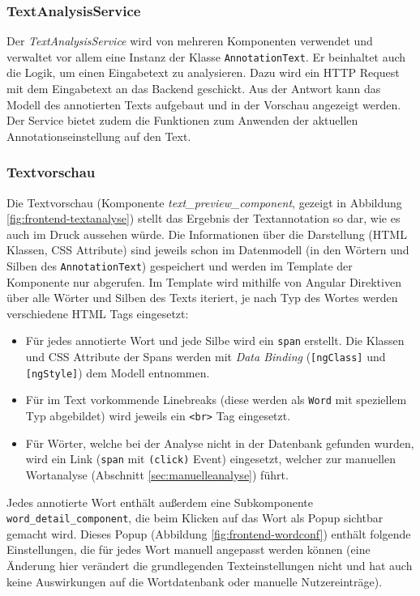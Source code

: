 \subsubsection{TextAnalysisService}

Der \textit{TextAnalysisService} wird von mehreren Komponenten verwendet und verwaltet vor allem eine Instanz der Klasse \texttt{AnnotationText}. Er beinhaltet auch die Logik, um einen Eingabetext zu analysieren. Dazu wird ein HTTP Request mit dem Eingabetext an das Backend geschickt. Aus der Antwort kann das Modell des annotierten Texts aufgebaut und in der Vorschau angezeigt werden. Der Service bietet zudem die Funktionen zum Anwenden der aktuellen Annotationseinstellung auf den Text.

\subsubsection{Textvorschau}

Die Textvorschau (Komponente \textit{text\_preview\_component}, gezeigt in Abbildung \ref{fig:frontend-textanalyse}) stellt das Ergebnis der Textannotation so dar, wie es auch im Druck aussehen würde. Die Informationen über die Darstellung (HTML Klassen, CSS Attribute) sind jeweils schon im Datenmodell (in den Wörtern und Silben des \texttt{AnnotationText}) gespeichert und werden im Template der Komponente nur abgerufen. Im Template wird mithilfe von Angular Direktiven über alle Wörter und Silben des Texts iteriert, je nach Typ des Wortes werden verschiedene HTML Tags eingesetzt:
\begin{itemize}
	\item Für jedes annotierte Wort und jede Silbe wird ein \texttt{span} erstellt. Die Klassen und CSS Attribute der  Spans werden mit \textit{Data Binding} (\texttt{[ngClass]} und \texttt{[ngStyle]}) dem Modell entnommen.
	
	\item Für im Text vorkommende Linebreaks (diese werden als \texttt{Word} mit speziellem Typ abgebildet) wird jeweils ein \texttt{<br>} Tag eingesetzt.
	
	\item Für Wörter, welche bei der Analyse nicht in der Datenbank gefunden wurden, wird ein Link (\texttt{span} mit \texttt{(click)} Event) eingesetzt, welcher zur manuellen Wortanalyse (Abschnitt \ref{sec:manuelleanalyse}) führt.
\end{itemize}

Jedes annotierte Wort enthält außerdem eine Subkomponente \texttt{word\_detail\_component}, die beim Klicken auf das Wort als Popup sichtbar gemacht wird. Dieses Popup (Abbildung \ref{fig:frontend-wordconf}) enthält folgende Einstellungen, die für jedes Wort manuell angepasst werden können (eine Änderung hier verändert die grundlegenden Texteinstellungen nicht und hat auch keine Auswirkungen auf die Wortdatenbank oder manuelle Nutzereinträge).

